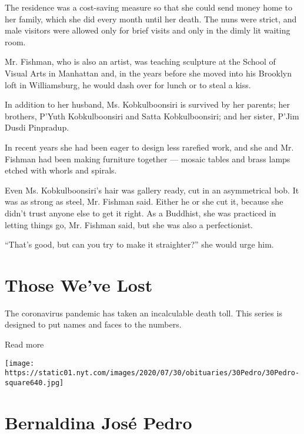 The residence was a cost-saving measure so that she could send money
home to her family, which she did every month until her death. The nuns
were strict, and male visitors were allowed only for brief visits and
only in the dimly lit waiting room.

Mr. Fishman, who is also an artist, was teaching sculpture at the School
of Visual Arts in Manhattan and, in the years before she moved into his
Brooklyn loft in Williamsburg, he would dash over for lunch or to steal
a kiss.

In addition to her husband, Ms. Kobkulboonsiri is survived by her
parents; her brothers, P'Yuth Kobkulboonsiri and Satta Kobkulboonsiri;
and her sister, P'Jim Dusdi Pinpradup.

In recent years she had been eager to design less rarefied work, and she
and Mr. Fishman had been making furniture together --- mosaic tables and
brass lamps etched with whorls and spirals.

Even Ms. Kobkulboonsiri's hair was gallery ready, cut in an asymmetrical
bob. It was as strong as steel, Mr. Fishman said. Either he or she cut
it, because she didn't trust anyone else to get it right. As a Buddhist,
she was practiced in letting things go, Mr. Fishman said, but she was
also a perfectionist.

``That's good, but can you try to make it straighter?'' she would urge
him.

\href{https://www.nytimes.com/interactive/2020/obituaries/people-died-coronavirus-obituaries.html?action=click\&pgtype=Article\&state=default\&region=BELOW_MAIN_CONTENT\&context=covid_obits_promo}{}

\hypertarget{those-weve-lost}{%
\section{Those We've Lost}\label{those-weve-lost}}

The coronavirus pandemic has taken an incalculable death toll. This
series is designed to put names and faces to the numbers.

Read more

\texttt{[image: https://static01.nyt.com/images/2020/07/30/obituaries/30Pedro/30Pedro-square640.jpg]}

\hypertarget{bernaldina-josuxe9-pedro}{%
\section{Bernaldina José Pedro}\label{bernaldina-josuxe9-pedro}}


